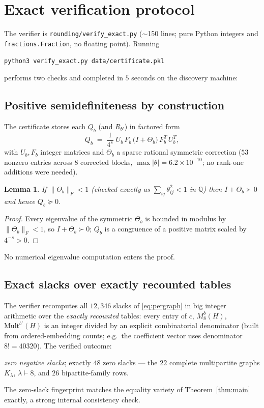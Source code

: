 \documentclass[11pt]{article}
\newtheorem{lemma}[theorem]{Lemma}
\theoremstyle{definition}
\newcommand{\Q}{\mathbb Q}
\begin{document}
\section{Exact verification protocol}\label{sec:verify}

The verifier is \texttt{rounding/verify\_exact.py}
($\sim$150 lines; pure Python integers and \texttt{fractions.Fraction}, no
floating point).  Running
\begin{center}
\texttt{python3 verify\_exact.py data/certificate.pkl}
\end{center}
performs two checks and completed in $5$ seconds on the discovery machine:

\subsection{Positive semidefiniteness by construction}

The certificate stores each $Q_b$ (and $R_{b'}$) in factored form
\[
  Q_b\;=\;\frac1{4^{s}}\;U_b\,F_b\,\big(I+\Theta_b\big)\,F_b^{T}\,U_b^{T},
\]
with $U_b,F_b$ integer matrices and $\Theta_b$ a sparse rational symmetric
correction ($53$ nonzero entries across $8$ corrected blocks, $\max|\theta| =
6.2\times10^{-10}$; no rank-one additions were needed).

\begin{lemma}\label{lem:psd}
If $\|\Theta_b\|_F<1$ \textup{(}checked exactly as
$\sum_{ij}\theta_{ij}^2<1$ in $\Q$\textup{)} then $I+\Theta_b\succ0$ and hence
$Q_b\succeq0$.
\end{lemma}

\begin{proof}
Every eigenvalue of the symmetric $\Theta_b$ is bounded in modulus by
$\|\Theta_b\|_F<1$, so $I+\Theta_b\succ0$; $Q_b$ is a congruence of a positive
matrix scaled by $4^{-s}>0$.
\end{proof}

No numerical eigenvalue computation enters the proof.

\subsection{Exact slacks over exactly recounted tables}

The verifier recomputes all $12{,}346$ slacks of \eqref{eq:pergraph} in big
integer arithmetic over the \emph{exactly recounted} tables: every entry of
$c$, $M_8^b(H)$, $\mathrm{Mult}^{b'}(H)$ is an integer divided by an explicit
combinatorial denominator (built from ordered-embedding counts; e.g.\ the
coefficient vector uses denominator $8!=40320$).  The verified outcome:
\begin{center}
\emph{zero negative slacks}; exactly $48$ zero slacks --- the $22$ complete
multipartite graphs $K_\lambda$, $\lambda\vdash 8$, and $26$
bipartite-family rows.
\end{center}
The zero-slack fingerprint matches the equality variety of
Theorem~\ref{thm:main} exactly, a strong internal consistency check.
\end{document}
